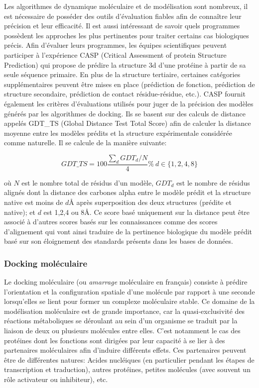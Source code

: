 Les algorithmes de dynamique moléculaire et de modélisation sont nombreux, il est nécessaire de posséder des outils d'évaluation fiables afin de connaître leur précision et leur efficacité. Il est aussi intéressant de savoir quels programmes possèdent les approches les plus pertinentes pour traiter certains cas biologiques précis. Afin d'évaluer leurs programmes, les équipes scientifiques peuvent participer à l'expérience CASP (Critical Assessment of protein Structure Prediction) qui propose de prédire la structure 3d d'une protéine à partir de sa seule séquence primaire. En plus de la structure tertiaire, certaines catégories supplémentaires peuvent être mises en place (prédiction de fonction, prédiction de structure secondaire, prédiction de contact résidue-résidue, etc.). CASP fournit également les critères d'évaluations utilisés pour juger de la précision des modèles générés par les algorithmes de docking. Ils se basent sur des calculs de distance appelés GDT\_TS (Global Distance Test Total Score) afin de calculer la distance moyenne entre les modèles prédits et la structure expérimentale considérée comme naturelle. Il se calcule de la manière suivante:

$$GDT\_TS = 100\frac{\sum_dGDT_d/N}{4}\%\ d\in\{1,2,4,8\}$$

où $N$ est le nombre total de résidus d'un modèle, $GDT_d$ est le nombre de résidus alignés dont la distance des carbones alpha entre le modèle prédit et la structure native est moins de $d$\r{A} après superposition des deux structures (prédite et native); et $d$ est 1,2,4 ou 8\r{A}.
Ce score basé uniquement sur la distance peut être associé à d'autres scores basés sur les connaissances comme des scores d'alignement qui vont ainsi traduire de la pertinence biologique du modèle prédit basé sur son éloignement des standards présents dans les bases de données.

\subsubsection{Docking moléculaire}

Le docking moléculaire (ou \textit{amarrage} moléculaire en français) consiste à prédire l'orientation et la configuration spatiale d'une molécule par rapport à une seconde lorsqu’elles se lient pour former un complexe moléculaire stable. Ce domaine de la modélisation moléculaire est de grande importance, car la quasi-exclusivité des réactions métaboliques se déroulant au sein d'un organisme se traduit par la liaison de deux ou plusieurs molécules entre elles. C'est notamment le cas des protéines dont les fonctions sont dirigées par leur capacité à se lier à des partenaires moléculaires afin d'induire différents effets. Ces partenaires peuvent être de différentes natures: Acides nucléiques (en particulier pendant les étapes de transcription et traduction), autres protéines, petites molécules (avec souvent un rôle activateur ou inhibiteur), etc.

